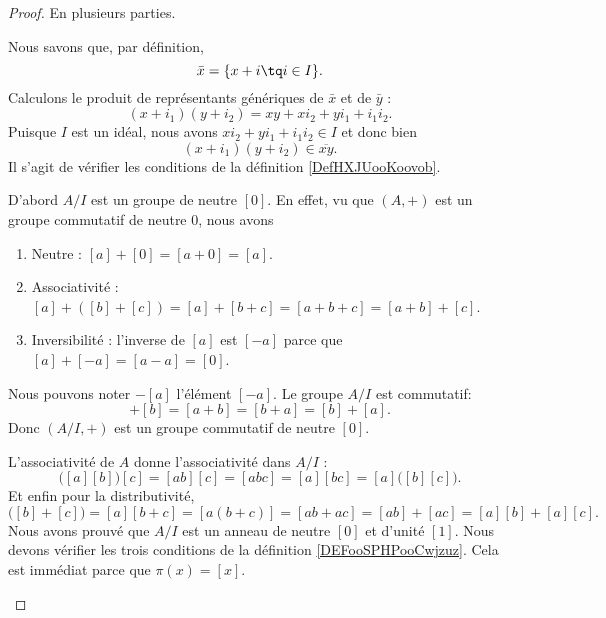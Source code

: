 \begin{proof}
	En plusieurs parties.
	\begin{subproof}
		Nous savons que, par définition,
		\begin{equation}
			\bar x=\{ x+i\tq i\in I \}.
		\end{equation}
		Calculons le produit de représentants génériques de \( \bar x\) et de \( \bar y\) :
		\begin{equation}
			(x+i_1)(y+i_2)=xy+xi_2+yi_1+i_1i_2.
		\end{equation}
		Puisque \( I\) est un idéal, nous avons \( xi_2+yi_1+i_1i_2\in I\) et donc bien
		\begin{equation}
			(x+i_1)(y+i_2)\in \overline{ xy }.
		\end{equation}
		Il s'agit de vérifier les conditions de la définition \ref{DefHXJUooKoovob}.

		D'abord \( A/I\) est un groupe de neutre \( [0]\). En effet, vu que \( (A,+)\) est un groupe commutatif de neutre \( 0\), nous avons
		\begin{enumerate}
			\item Neutre : $[a]+[0]=[a+0]=[a]$.
			\item Associativité :
			      $[a]+([b]+[c])=[a]+[b+c]=[a+b+c]=[a+b]+[c]$.
			\item Inversibilité : l'inverse de \( [a]\) est \( [-a]\) parce que \( [a]+[-a]= [a-a]=[0] \).
		\end{enumerate}
		Nous pouvons noter \( -[a]\) l'élément \( [-a]\). Le groupe \( A/I\) est commutatif:
		\begin{equation}
			[a]+[b]=[a+b]=[b+a]=[b]+[a].
		\end{equation}
		Donc \( (A/I,+)\) est un groupe commutatif de neutre \( [0]\).

		L'associativité de \( A\) donne l'associativité dans \( A/I\) :
		\begin{equation}
			\big( [a][b] \big)[c]=[ab][c]=[abc]=[a][bc]=[a]\big( [b][c] \big).
		\end{equation}
		Et enfin pour la distributivité,
		\begin{equation}
			[a]\big( [b]+[c] \big)=[a][b+c]=[a(b+c)]=[ab+ac]=[ab]+[ac]=[a][b]+[a][c].
		\end{equation}
		Nous avons prouvé que \( A/I\) est un anneau de neutre \( [0]\) et d'unité \( [1]\).
		Nous devons vérifier les trois conditions de la définition \ref{DEFooSPHPooCwjzuz}. Cela est immédiat parce que \( \pi(x)=[x]\).
	\end{subproof}
\end{proof}


